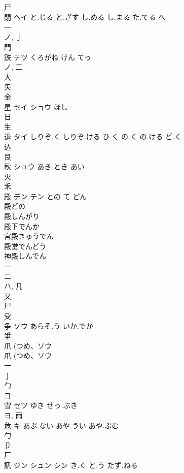 \documentclass[8pt]{extreport}
\begin{document}
\begin{CJK}{UTF8}{min}
\\	尸 
\\	閉	ヘイ	と.じる と.ざす し.める し.まる た.てる へ	
\\	一 
\\	ノ, 亅 
\\	門 
\\	鉄	テツ	くろがね けん てっ	
\\	ノ, 二 
\\	大 
\\	矢 
\\	金 
\\	星	セイ ショウ	ほし	
\\	日 
\\	生 
\\	退	タイ	しりぞ.く しりぞ.ける ひ.く の.く の.ける ど.く	
\\	込 
\\	艮 
\\	秋	シュウ	あき とき あい	
\\	火 
\\	禾 
\\	殿	デン テン	との て どん	
\\	殿どの
\\	殿しんがり
\\	殿下でんか
\\	宮殿きゅうでん
\\	殿堂でんどう
\\	神殿しんでん
\\	一 
\\	二 
\\	ハ, 几 
\\	又 
\\	尸 
\\	殳 
\\	争	ソウ	あらそ.う いか.でか	
\\	爭. 
\\	爪 (つめ、ソウ 
\\	爪 (つめ、ソウ 
\\	一 
\\	亅 
\\	勹 
\\	ヨ	
\\	雪	セツ	ゆき せっ ぶき	
\\	ヨ, 雨 
\\	危	キ	あぶ.ない あや.うい あや.ぶむ	
\\	勹 
\\	卩 
\\	厂 
\\	訊	ジン シュン シン	き.く と.う たず.ねる	

\end{CJK}
\end{document}
